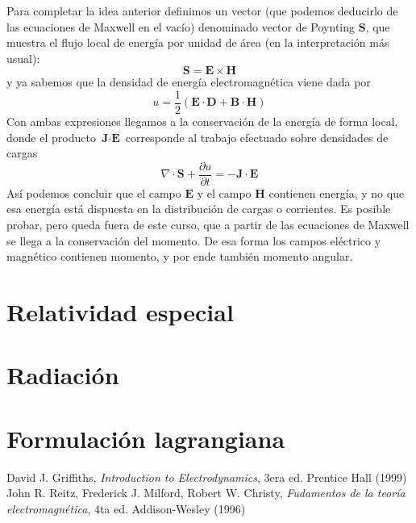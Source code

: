 \documentclass[11pt,a4paper]{article}
\numberwithin{equation}{section}
\begin{document}
Para completar la idea anterior definimos un vector (que podemos deducirlo de las ecuaciones de Maxwell en el vacío) denominado vector de Poynting $\textbf{S}$, que muestra el flujo local de energía por unidad de área (en la interpretación más usual):
\begin{equation}
    \textbf{S} = \textbf{E} \times \textbf{H}
    \label{eq:em_poyting}
\end{equation}
y ya sabemos que la densidad de energía electromagnética viene dada por
\begin{equation}
    u = \frac{1}{2} (\textbf{E} \cdot \textbf{D} + \textbf{B} \cdot \textbf{H})
    \label{eq:em_densidad_energia}
\end{equation}
Con ambas expresiones llegamos a la conservación de la energía de forma local, donde el producto $\textbf{J} \cdot \textbf{E}$ corresponde al trabajo efectuado sobre densidades de cargas
\begin{equation}
    \nabla \cdot \textbf{S} + \frac{\partial u}{\partial t} = -\textbf{J} \cdot \textbf{E}
    \label{eq:em_ec_continuidad}
\end{equation}
Así podemos concluir que el campo $\textbf{E}$ y el campo $\textbf{H}$ contienen energía, y no que esa energía está dispuesta en la distribución de cargas o corrientes. Es posible probar, pero queda fuera de este curso, que a partir de las ecuaciones de Maxwell se llega a la conservación del momento. De esa forma los campos eléctrico y magnético contienen momento, y por ende también momento angular.

\section{Relatividad especial}

\section{Radiación}

\section{Formulación lagrangiana}


\begin{thebibliography}{9}
        David J. Griffiths, 
        \emph{Introduction to Electrodynamics},
        3era ed.
        Prentice Hall
        (1999)
        John R. Reitz, Frederick J. Milford, Robert W. Christy,
        \emph{Fudamentos de la teoría electromagnética},
        4ta ed.
        Addison-Wesley
        (1996)
\end{thebibliography}
\end{document}
